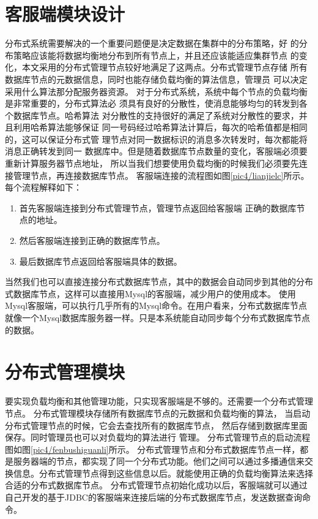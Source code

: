 \section{客服端模块设计}
分布式系统需要解决的一个重要问题便是决定数据在集群中的分布策略，好
的分布策略应该能将数据均衡地分布到所有节点上，并且还应该能适应集群节点
的变化，本文采用的分布式管理节点较好地满足了这两点。分布式管理节点存储
所有数据库节点的元数据信息，同时也能存储负载均衡的算法信息，管理员
可以决定采用什么算法那分配服务器资源。
对于分布式系统，系统中每个节点的负载均衡是非常重要的，分布式算法必
须具有良好的分散性，使消息能够均匀的转发到各个数据库节点。哈希算法
对分散性的支持很好的满足了系统对分散性的要求，并且利用哈希算法能够保证
同一号码经过哈希算法计算后，每次的哈希值都是相同的，这可以保证分布式管
理节点对同一数据标识的消息多次转发时，每次都能将消息正确转发到同一
数据库中。但是随着数据库节点数量的变化，客服端必须要重新计算服务器节点地址，
所以当我们想要使用负载均衡的时候我们必须要先连接管理节点，再连接数据库节点。
客服端连接的流程图如图\ref{pic4/lianjielc}所示。
每个流程解释如下：
\begin{enumerate}[fullwidth,itemindent=2em,listparindent=2em]
	\item 首先客服端连接到分布式管理节点，管理节点返回给客服端
	正确的数据库节点的地址。
	\item 然后客服端连接到正确的数据库节点。
	\item 最后数据库节点返回给客服端具体的数据。
\end{enumerate}
当然我们也可以直接连接分布式数据库节点，其中的数据会自动同步到其他的分布式数据库节点，这样可以直接用Mysql的客服端，减少用户的使用成本。
使用Mysql客服端，可以执行几乎所有的Mysql命令。在用户看来，分布式数据库节点就像一个Mysql数据库服务器一样。只是本系统能自动同步每个分布式数据库节点的数据。
\section{分布式管理模块}
要实现负载均衡和其他管理功能，只实现客服端是不够的。还需要一个分布式管理节点。
分布式管理模块存储所有数据库节点的元数据和负载均衡的算法，
当启动分布式管理节点的时候，它会去查找所有的数据库节点，
然后存储到数据库里面保存。同时管理员也可以对负载均的算法进行
管理。
分布式管理节点的启动流程图如图\ref{pic4/fenbushiguanli}所示。
分布式管理节点和分布式数据库节点一样，都是服务器端的节点，都实现了同一个分布式功能。他们之间可以通过多播通信来交换信息。分布式管理节点得到这些信息以后。就能使用正确的负载均衡算法来选择合适的分布式数据库节点。
分布式管理节点初始化成功以后，客服端就可以通过自己开发的基于JDBC的客服端来连接后端的分布式数据库节点，发送数据查询命令。
